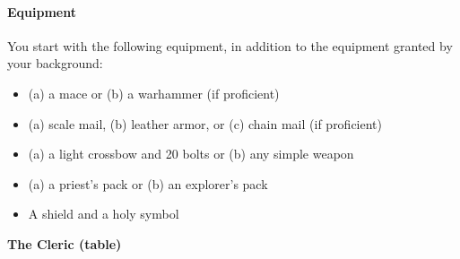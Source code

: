 \paragraph{Equipment}\label{Cleric_equipment}

You start with the following equipment, in addition to the equipment
granted by your background:

\begin{itemize}
\item
  (a) a mace or (b) a warhammer (if proficient)
\item
  (a) scale mail, (b) leather armor, or (c) chain mail (if proficient)
\item
  (a) a light crossbow and 20 bolts or (b) any simple weapon
\item
  (a) a priest's pack or (b) an explorer's pack
\item
  A shield and a holy symbol
\end{itemize}

\textbf{The Cleric (table)}

